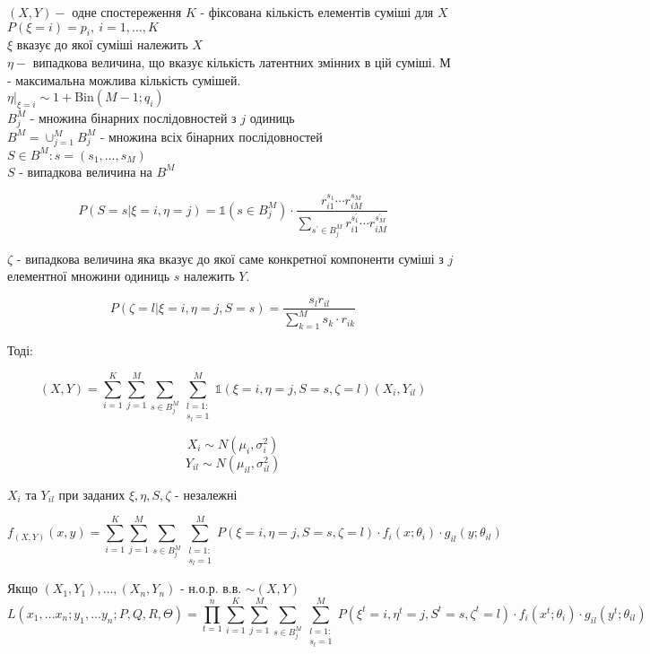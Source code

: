 \documentclass[14pt]{article}
\begin{document}
\raggedright
\fontsize{12pt}{16pt}\selectfont

$(X, Y)-$ одне спостереження   
$K$ - фіксована кількість елементів суміші для $X$ \\
$P(\xi=i)=p_i, \: i= 1, \dots, K$ \\
$\xi$ вказує до якої суміші належить $X$ \\
$\eta-$ випадкова величина, що вказує кількість латентних змінних в цій суміші. $М$ - максимальна можлива кількість сумішей. \\
$\eta |_{\xi=i} \sim 1 + \text{Bin}(M-1; q_i)$ \\

$B_j^M$ - множина бінарних послідовностей з $j$ одиниць \\
$B^M = \cup_{j=1}^M B_j^M$ - множина всіх бінарних послідовностей \\
$S \in B^M: s=(s_1, \dots, s_M)$ \\
$S$ - випадкова величина на $B^M$

$$P(S=s| \xi=i, \eta=j) = \mathds{1}(s \in B^M_j) \cdot \frac{r_{i1}^{s_1} \cdots r_{iM}^{s_M}}{\sum_{s^{'} \in B^M_j} r_{i1}^{s^{'}_1} \cdots r_{iM}^{s^{'}_M}}$$


$\zeta$ - випадкова величина яка вказує до якої саме конкретної компоненти суміші з $j$ елементної множини одиниць $s$ належить $Y$.

$$P(\zeta=l | \xi=i, \eta=j, S=s) = \frac{s_l r_{il}}{\sum_{k=1}^{M} s_k \cdot r_{ik}}$$

Тоді:

$$(X, Y) = \sum_{i=1}^{K} \sum_{j=1}^{M} \sum_{s \in B^M_j} \sum_{\substack{l=1:\\ s_l=1}}^{M} \mathds{1}(\xi=i, \eta=j, S=s, \zeta=l) (X_i, Y_{il})$$

$$X_i \sim N(\mu_i, \sigma_i^2)$$
$$Y_{il} \sim N(\mu_{il}, \sigma_{il}^2)$$

$X_i$ та $Y_{il}$ при заданих $\xi, \eta, S, \zeta$ - незалежні

$$f_{(X, Y)}(x, y) = \sum_{i=1}^{K} \sum_{j=1}^{M} \sum_{s \in B^M_j} \sum_{\substack{l=1:\\ s_l=1}}^{M} P(\xi=i, \eta=j, S=s, \zeta=l) \cdot f_i(x; \theta_i) \cdot g_{il}(y; \theta_{il})$$

Якщо $(X_1, Y_1), \dots, (X_n, Y_n)$ - н.о.р. в.в. $\sim (X, Y)$ \\

$$L(x_1, \dots x_n; y_1, \dots y_n; P, Q, R, \Theta) = \prod_{t=1}^{n} \sum_{i=1}^{K} \sum_{j=1}^{M} \sum_{s \in B^M_j} \sum_{\substack{l=1:\\ s_l=1}}^{M} P(\xi^t=i, \eta^t=j, S^t=s, \zeta^t=l) \cdot f_i(x^t; \theta_i) \cdot g_{il}(y^t; \theta_{il})$$
\end{document}
